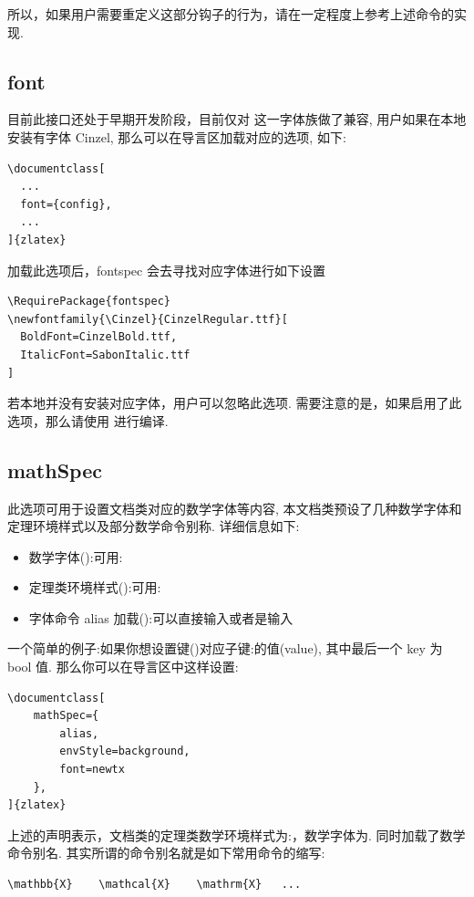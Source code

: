 所以，如果用户需要重定义这部分钩子的行为，请在一定程度上参考上述命令的实现.

\subsection{font}
目前此接口还处于早期开发阶段，目前仅对 \cmd[F]{\Cinzel} 这一字体族做了兼容, 用户如果在本地安装有字体 Cinzel, 
那么可以在导言区加载对应的选项, 如下:
\begin{verbatim}
\documentclass[
  ...
  font={config},
  ...
]{zlatex}
\end{verbatim}

加载此选项后，fontspec 会去寻找对应字体进行如下设置
\begin{verbatim}
\RequirePackage{fontspec}
\newfontfamily{\Cinzel}{CinzelRegular.ttf}[
  BoldFont=CinzelBold.ttf,
  ItalicFont=SabonItalic.ttf
]
\end{verbatim}

若本地并没有安装对应字体，用户可以忽略此选项. 需要注意的是，如果启用了此选项，那么请使用  进行编译.

\subsection{mathSpec}
此选项可用于设置文档类对应的数学字体等内容, 本文档类预设了几种数学字体和定理环境样式以及部分数学命令别称. 详细信息如下:
\begin{itemize}
    \item 数学字体():可用:
    \item 定理类环境样式():可用:
    \item 字体命令 alias 加载():可以直接输入或者是输入
\end{itemize}

一个简单的例子:如果你想设置键()对应子键:的值(value), 其中最后一个 key 为 bool 值.
那么你可以在导言区中这样设置:

\begin{verbatim}
\documentclass[
    mathSpec={
        alias,
        envStyle=background,  
        font=newtx
    },
]{zlatex}
\end{verbatim}

上述的声明表示，文档类的定理类数学环境样式为:，数学字体为. 同时加载了数学命令别名.
其实所谓的命令别名就是如下常用命令的缩写:
\begin{verbatim}
\mathbb{X}    \mathcal{X}    \mathrm{X}   ...
\end{verbatim}

